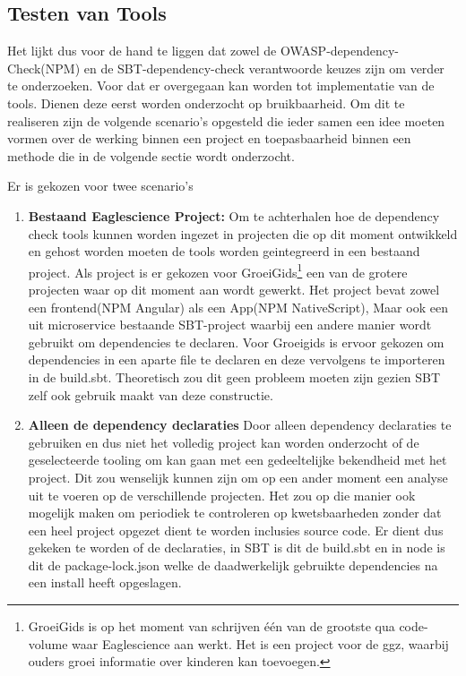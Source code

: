 





\subsection{Testen van Tools}

Het lijkt dus voor de hand te liggen dat zowel de OWASP-dependency-Check(NPM) en de SBT-dependency-check verantwoorde keuzes zijn om verder te onderzoeken. Voor dat er overgegaan kan worden tot implementatie van de tools. Dienen deze eerst worden onderzocht op bruikbaarheid. Om dit te realiseren zijn de volgende scenario's opgesteld die ieder samen een idee moeten vormen over de werking binnen een project en toepasbaarheid binnen een methode die in de volgende sectie wordt onderzocht.

Er is gekozen voor twee scenario's
\begin{enumerate}
    \item \textbf{Bestaand Eaglescience Project: }Om te achterhalen hoe de dependency check tools kunnen worden ingezet in projecten die op dit moment ontwikkeld en gehost worden moeten de tools worden geintegreerd in een bestaand project. Als project is er gekozen voor GroeiGids\footnote{GroeiGids is op het moment van schrijven één van de grootste qua code-volume waar Eaglescience aan werkt. Het is een project voor de ggz, waarbij ouders groei informatie over kinderen kan toevoegen.} een van de grotere projecten waar op dit moment aan wordt gewerkt. Het project bevat zowel een frontend(NPM Angular) als een App(NPM NativeScript), Maar ook een uit microservice bestaande SBT-project waarbij een andere manier wordt gebruikt om dependencies te declaren. Voor Groeigids is ervoor gekozen om dependencies in een aparte file te declaren en deze vervolgens te importeren in de build.sbt. Theoretisch zou dit geen probleem moeten zijn gezien SBT zelf ook gebruik maakt van deze constructie.
    \item \textbf{Alleen de dependency declaraties} Door alleen dependency declaraties te gebruiken en dus niet het volledig project kan worden onderzocht of de geselecteerde tooling om kan gaan met een gedeeltelijke bekendheid met het project. Dit zou wenselijk kunnen zijn om op een ander moment een analyse uit te voeren op de verschillende projecten. Het zou op die manier ook mogelijk maken om periodiek te controleren op kwetsbaarheden zonder dat een heel project opgezet dient te worden inclusies source code. Er dient dus gekeken te worden of de declaraties, in SBT is dit de build.sbt en in node is dit de package-lock.json welke de daadwerkelijk gebruikte dependencies na een install heeft opgeslagen.
\end{enumerate}

